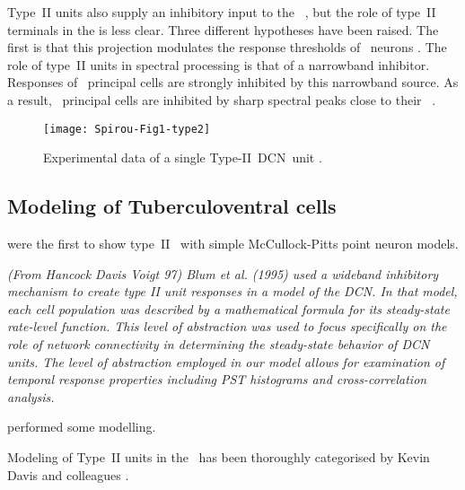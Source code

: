 \smallskip{}

Type~II units also supply an inhibitory input to the
\VCN~\citep{WickesbergOertel:1990}, but the role of type~II terminals in the
\VCN is less clear. Three different hypotheses have been raised. The ﬁrst is
that this projection modulates the response thresholds of \VCN~neurons
\citep{PaoliniClark:1998}.  The role of type~II units in spectral processing is
that of a narrowband inhibitor. Responses of \DCN~principal cells are strongly
inhibited by this narrowband source. As a result, \DCN~principal cells are
inhibited by sharp spectral peaks close to their
\BF~\citep{SpirouDavisEtAl:1999}.

\smallskip{}

\begin{figure}[htb]
  \centering
  \texttt{[image: Spirou-Fig1-type2]}
  \caption{Experimental data of a single Type-II~DCN~unit
    \citep[Fig.~1]{SpirouDavisEtAl:1999}.}
  \label{fig:SpirouFig1}
\end{figure}


\subsection{Modeling of Tuberculoventral cells}


\citet{ArleKim:1991a} were the first to show type~II \EIRA~with simple
McCullock-Pitts point neuron models.


{\it (From Hancock Davis Voigt 97) Blum et al. (1995) used a wideband inhibitory
  mechanism to create type II unit responses in a model of the DCN. In that
  model, each cell population was described by a mathematical formula for its
  steady-state rate-level function. This level of abstraction was used to focus
  specifically on the role of network connectivity in determining the
  steady-state behavior of DCN units. The level of abstraction employed in our
  model allows for examination of temporal response properties including PST
  histograms and cross-correlation analysis.}

\citep{DunnVetterEtAl:1996} performed some modelling.


Modeling of Type~II units in the \DCN~has been thoroughly categorised by Kevin
Davis and colleagues \citep{YoungDavis:2002,HancockDavisEtAl:2001,DavisYoung:2000,SpirouDavisEtAl:1999,HancockDavisEtAl:1997,DavisVoigt:1996,DavisVoigt:1994,DavisVoigt:1991}.

